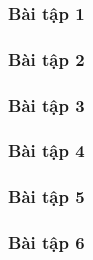 \documentclass[a4paper]{article}
\begin{document}
\subsubsection{Bài tập 1}

\clearpage
\subsubsection{Bài tập 2}

\clearpage
\subsubsection{Bài tập 3}

\clearpage
\subsubsection{Bài tập 4}

\clearpage
\subsubsection{Bài tập 5}

\clearpage
\subsubsection{Bài tập 6}

\clearpage
\end{document}
